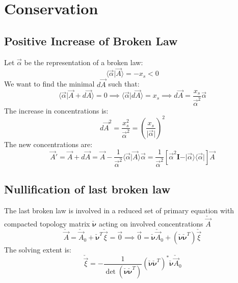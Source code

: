 \documentclass[aps,12pt]{revtex4}
\begin{document}
\section{Conservation}

\subsection{Positive Increase of Broken Law}
Let $\vec \alpha$ be the representation of a broken law:
\begin{equation}
	\langle \vec \alpha \vert \vec A \rangle = - x_s < 0
\end{equation}
We want to find the minimal $d \vec A$ such that:
\begin{equation}
	\langle \vec \alpha \vert \vec A + d\vec A \rangle = 0 \implies \langle \vec \alpha \vert d \vec A \rangle = x_s \implies d \vec A = \dfrac{x_s}{\vec\alpha^2} \vec \alpha
\end{equation}
The increase in concentrations is:
\begin{equation}
	d \vec A^2 = \dfrac{x_s^2}{\vec \alpha^2} = \left( \dfrac{x_s}{\vert\vec\alpha\vert}\right) ^2
\end{equation}
The new concentrations are:
\begin{equation}
	\vec A ' = \vec A + d \vec A = \vec{A} - \dfrac{1}{\vec \alpha^2} \langle \vec \alpha \vert \vec A \rangle \vec \alpha 
	= \dfrac{1}{\vec \alpha^2} \left[ \vec \alpha^2 \bm I - \vert \vec \alpha \rangle \langle \vec \alpha \vert \right] \vec A
\end{equation}

\subsection{Nullification of last broken law}
The last broken law is involved in a reduced set of primary equation with
compacted topology matrix $\check {\bm \nu}$ acting on involved concentrations $\check {\vec A}$ 
\begin{equation}
 	\check {\vec A} = \check {\vec A}_0 + \check {\bm \nu}^T \check{\vec \xi} = \vec 0 \implies \vec 0 = \check {\bm \nu}  \check {\vec A}_0  + \left(\check {\bm \nu} \check {\bm \nu}^T \right) \check {\vec \xi}
\end{equation}
The solving extent is:
\begin{equation}
	\check {\vec \xi} = - \dfrac{1}{\det \left(\check {\bm \nu} \check {\bm \nu}^T \right) } \left(\check {\bm \nu} \check {\bm \nu}^T \right) ^\ast \check {\bm \nu} \check {\vec A}_0
\end{equation}
		
\end{document}
